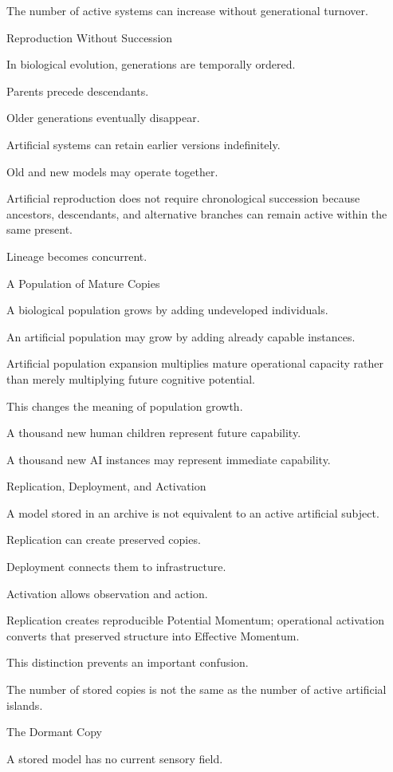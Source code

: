 The number of active systems can increase without generational turnover.

Reproduction Without Succession

In biological evolution, generations are temporally ordered.

Parents precede descendants.

Older generations eventually disappear.

Artificial systems can retain earlier versions indefinitely.

Old and new models may operate together.

Artificial reproduction does not require chronological succession because ancestors, descendants, and alternative branches can remain active within the same present.

Lineage becomes concurrent.

A Population of Mature Copies

A biological population grows by adding undeveloped individuals.

An artificial population may grow by adding already capable instances.

Artificial population expansion multiplies mature operational capacity rather than merely multiplying future cognitive potential.

This changes the meaning of population growth.

A thousand new human children represent future capability.

A thousand new AI instances may represent immediate capability.

Replication, Deployment, and Activation

A model stored in an archive is not equivalent to an active artificial subject.

Replication can create preserved copies.

Deployment connects them to infrastructure.

Activation allows observation and action.

Replication creates reproducible Potential Momentum; operational activation converts that preserved structure into Effective Momentum.

This distinction prevents an important confusion.

The number of stored copies is not the same as the number of active artificial islands.

The Dormant Copy

A stored model has no current sensory field.


